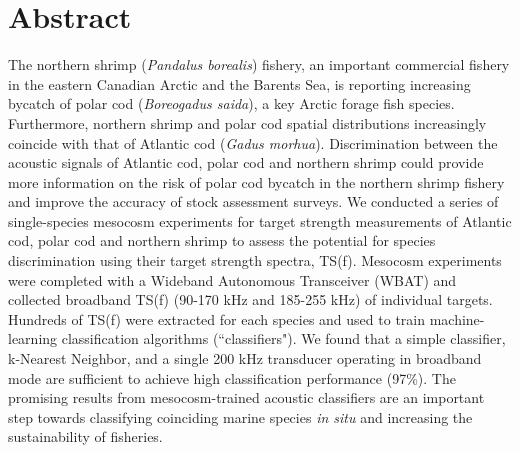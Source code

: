 \section{Abstract}
The northern shrimp (\textit{Pandalus borealis}) fishery, an important commercial fishery in the eastern Canadian Arctic and the Barents Sea, is reporting increasing bycatch of polar cod (\textit{Boreogadus saida}), a key Arctic forage fish species. Furthermore, northern shrimp and polar cod spatial distributions increasingly coincide with that of Atlantic cod (\textit{Gadus morhua}). Discrimination between the acoustic signals of Atlantic cod, polar cod and northern shrimp could provide more information on the risk of polar cod bycatch in the northern shrimp fishery and improve the accuracy of stock assessment surveys. We conducted a series of single-species mesocosm experiments for target strength measurements of Atlantic cod, polar cod and northern shrimp to assess the potential for species discrimination using their target strength spectra, TS(f). Mesocosm experiments were completed with a Wideband Autonomous Transceiver (WBAT) and collected broadband TS(f) (90-170 kHz and 185-255 kHz) of individual targets. Hundreds of TS(f) were extracted for each species and used to train machine-learning classification algorithms (``classifiers"). We found that a simple classifier, k-Nearest Neighbor, and a single 200 kHz transducer operating in broadband mode are sufficient to achieve high classification performance (97\%). The promising results from mesocosm-trained acoustic classifiers are an important step towards classifying coinciding marine species \textit{in situ} and increasing the sustainability of fisheries. 

